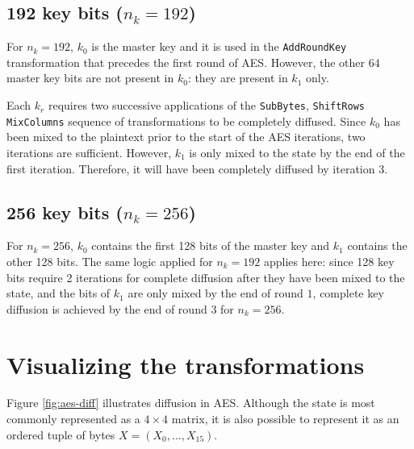 \documentclass{report}
\begin{document}
\subsection{192 key bits ($n_k = 192$)}
For $n_k = 192$, $k_0$ is the master key and it is used in the \texttt{AddRoundKey} transformation that precedes the first round of AES. However, the other $64$ master key bits are not present in $k_0$: they are present in $k_1$ only.

Each $k_r$ requires two successive applications of the \texttt{SubBytes}, \texttt{ShiftRows} \texttt{MixColumns} sequence of transformations to be completely diffused. Since $k_0$ has been mixed to the plaintext prior to the start of the AES iterations, two iterations are sufficient. However, $k_1$ is only mixed to the state by the end of the first iteration. Therefore, it will have been completely diffused by iteration 3.

\subsection{256 key bits ($n_k = 256$)}
For $n_k = 256$, $k_0$ contains the first 128 bits of the master key and $k_1$ contains the other 128 bits. The same logic applied for $n_k = 192$ applies here: since 128 key bits require 2 iterations for complete diffusion after they have been mixed to the state, and the bits of $k_1$ are only mixed by the end of round $1$, complete key diffusion is achieved by the end of round $3$ for $n_k = 256$.

\section{Visualizing the transformations}

Figure \ref{fig:aes-diff} illustrates diffusion in AES. Although the state is most commonly represented as a $4 \times 4$ matrix, it is also possible to represent it as an ordered tuple of bytes $X = (X_0, ..., X_15)$.
\end{document}
